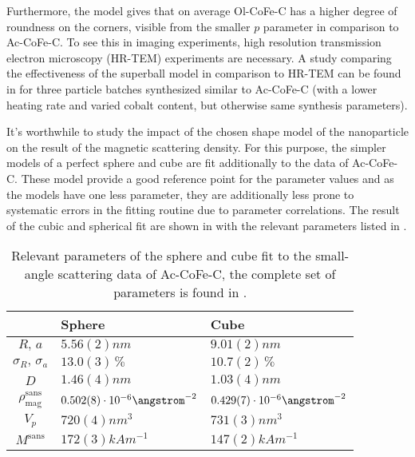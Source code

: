 \documentclass[\main/dresen_thesis.tex]{subfiles}
\begin{document}
    Furthermore, the model gives that on average Ol-CoFe-C has a higher degree of roundness on the corners, visible from the smaller $p$ parameter in comparison to Ac-CoFe-C.
    To see this in imaging experiments, high resolution transmission electron microscopy (HR-TEM) experiments are necessary.
    A study comparing the effectiveness of the superball model in comparison to HR-TEM can be found in  for three particle batches synthesized similar to Ac-CoFe-C (with a lower heating rate and varied cobalt content, but otherwise same synthesis parameters).


    It's worthwhile to study the impact of the chosen shape model of the nanoparticle on the result of the magnetic scattering density.
    For this purpose, the simpler models of a perfect sphere and cube are fit additionally to the data of Ac-CoFe-C.
    These model provide a good reference point for the parameter values and as the models have one less parameter, they are additionally less prone to systematic errors in the fitting routine due to parameter correlations.
    The result of the cubic and spherical fit are shown in  with the relevant parameters listed in .

    \begin{table}[ht]
      \centering
      \caption{\label{tab:monolayers:nanoparticle:sasSphereCubeFit}Relevant parameters of the sphere and cube fit to the small-angle scattering data of Ac-CoFe-C, the complete set of parameters is found in .}
      \begin{tabular}{ c | l | l }
          & Sphere & Cube \\
        \hline
        $R, \, a$
          & $5.56(2) \unit{nm}$
          & $9.01(2) \unit{nm}$\\
        $\sigma_R, \, \sigma_a$
          & $13.0(3) \,\%$
          & $10.7(2) \,\%$\\
        $D$
          & $1.46(4) \unit{nm}$
          & $1.03(4) \unit{nm}$\\
        $\rho_\mathrm{mag}^\mathrm{sans}$
          & $0.502(8) \cdot 10^{-6} \angstrom^{-2}$
          & $0.429(7) \cdot 10^{-6} \angstrom^{-2}$\\
        \hline
        $V_p$
          & $720(4) \unit{nm^{3}}$
          & $731(3) \unit{nm^{3}}$\\
        $M^\mathrm{sans}$
          & $172(3) \unit{kAm^{-1}}$
          & $147(2) \unit{kAm^{-1}}$\\
        \hline
      \end{tabular}
    \end{table}
\end{document}
